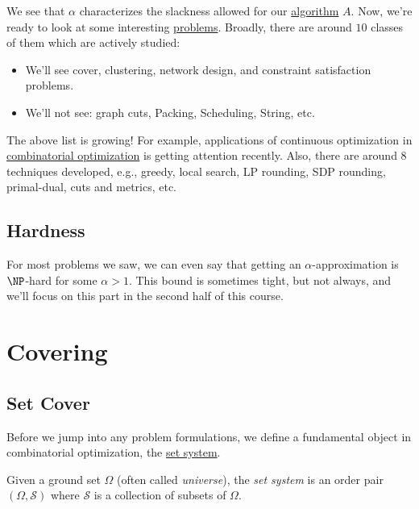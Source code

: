 We see that \(\alpha \) characterizes the slackness allowed for our \hyperref[def:algorithm]{algorithm} \(A\). Now, we're ready to look at some interesting \hyperref[def:combinatorial-optimization]{problems}. Broadly, there are around \(10\) classes of them which are actively studied:

\begin{itemize}
	\item We'll see cover, clustering, network design, and constraint satisfaction problems.
	\item We'll not see: graph cuts, Packing, Scheduling, String, etc.
\end{itemize}

The above list is growing! For example, applications of continuous optimization in \hyperref[def:combinatorial-optimization]{combinatorial optimization} is getting attention recently. Also, there are around \(8\) techniques developed, e.g., greedy, local search, LP rounding, SDP rounding, primal-dual, cuts and metrics, etc.

\section{Hardness}

For most problems we saw, we can even say that getting an \(\alpha\)-approximation is \(\NP\)-hard for some \(\alpha > 1\). This bound is sometimes tight, but not always, and we'll focus on this part in the second half of this course.

\chapter{Covering}\label{ch:covering}

\section{Set Cover}

Before we jump into any problem formulations, we define a fundamental object in combinatorial optimization, the \hyperref[def:set-system]{set system}.

\begin{definition}\label{def:set-system}
	Given a ground set \(\Omega\) (often called \emph{universe}), the \emph{set system} is an order pair \((\Omega , \mathcal{S} )\) where \(\mathcal{S} \) is a collection of subsets of \(\Omega\).
\end{definition}

